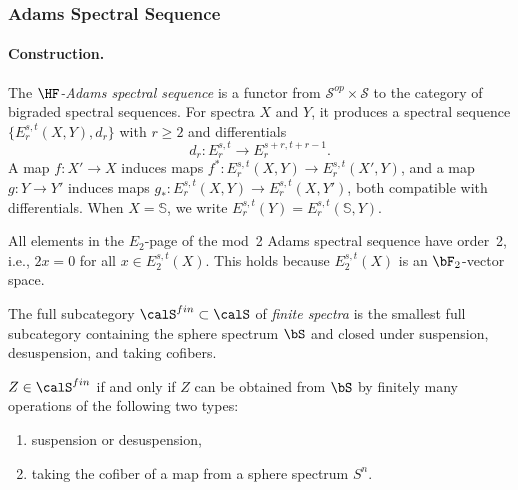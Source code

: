 \subsubsection{Adams Spectral Sequence}\label{sec:prereq-adams}

\paragraph{Construction.}

\begin{axiom}\label{prereq:ax:adams-ss}
    \leanok
    The \emph{$\HF$-Adams spectral sequence} is a functor from $\mathcal{S}^{op} \times \mathcal{S}$ to the category of bigraded spectral sequences. For spectra $X$ and $Y$, it produces a spectral sequence $\{E_r^{s,t}(X, Y), d_r\}$ with $r \ge 2$ and differentials
    $$d_r: E_r^{s,t} \to E_r^{s+r, t+r-1}.$$
    A map $f: X' \to X$ induces maps $f^*: E_r^{s,t}(X, Y) \to E_r^{s,t}(X', Y)$, and a map $g: Y \to Y'$ induces maps $g_*: E_r^{s,t}(X, Y) \to E_r^{s,t}(X, Y')$, both compatible with differentials. When $X = \mathbb{S}$, we write $E_r^{s,t}(Y) = E_r^{s,t}(\mathbb{S}, Y)$.
\end{axiom}

\begin{axiom}\label{prereq:ax:adams-e2-order2}
    \leanok
    All elements in the $E_2$-page of the mod~2 Adams spectral sequence have order~2, i.e., $2x = 0$ for all $x \in E_2^{s,t}(X)$. This holds because $E_2^{s,t}(X)$ is an $\bF_2$-vector space.
\end{axiom}

\begin{definition}\label{prereq:def:finite-spectra}
    The full subcategory $\calS^{fin} \subset \calS$ of \emph{finite spectra} is the smallest full subcategory containing the sphere spectrum $\bS$ and closed under suspension, desuspension, and taking cofibers.
\end{definition}

\begin{theorem}\label{prereq:thm:finite-spectra-char}
    $Z \in \calS^{fin}$ if and only if $Z$ can be obtained from $\bS$ by finitely many operations of the following two types:
    \begin{enumerate}
        \item suspension or desuspension,
        \item taking the cofiber of a map from a sphere spectrum $S^n$.
    \end{enumerate}
\end{theorem}

